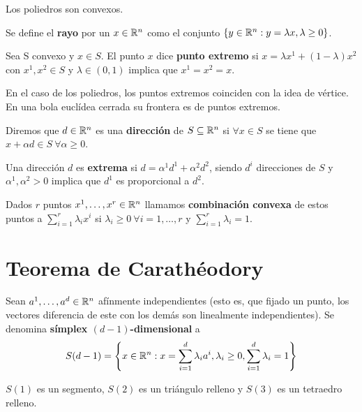 \documentclass[PM.tex]{subfiles}
\begin{document}
\begin{coro}
Los poliedros son convexos.
\end{coro}

\begin{defi}
Se define el \textbf{rayo} por un $x\in\mathbb{R}^n$ como el conjunto $\left\{y\in\mathbb{R}^n: y=\lambda x, \lambda\geq 0\right\}$.
\end{defi}

\begin{defi}
Sea S convexo y $x\in S$. El punto $x$ dice \textbf{punto extremo} si $x=\lambda x^1 +(1-\lambda)x^2$ con $x^1,x^2\in S$ y $\lambda\in (0,1)$ implica que $x^1=x^2=x$.
\end{defi}
\begin{nota}  En el caso de los poliedros, los puntos extremos coinciden con la idea de vértice. En una bola euclídea cerrada su frontera es de puntos extremos.
\end{nota}

\begin{defi}
Diremos que $d\in\mathbb{R}^n$ es una \textbf{dirección} de $S\subseteq\mathbb{R}^n$ si $\forall x\in S$ se tiene que $x+\alpha d\in S\ \forall\alpha\geq 0$.
\end{defi}

\begin{defi} Una dirección $d$ es \textbf{extrema} si $d=\alpha^1d^1+\alpha^2d^2$, siendo $d^i$ direcciones de $S$ y $\alpha^1,\alpha^2>0$ implica que $d^1$ es proporcional a $d^2$.
\end{defi}

\begin{defi}
Dados $r$ puntos $x^1,\dots, x^r\in\mathbb{R}^n$ llamamos \textbf{combinación convexa} de estos puntos a $\sum_{i=1}^r\lambda_i x^i$ si $\lambda_i\geq 0\ \forall i=1,\dots, r$ y $\sum_{i=1}^r\lambda_i=1$.
\end{defi}

\section{Teorema de Carathéodory}
\begin{defi} Sean $a^1,\dots, a^d\in\mathbb{R}^n$ afínmente independientes (esto es, que fijado un punto, los vectores diferencia de este con los demás son linealmente independientes). Se denomina \textbf{símplex $(d-1)$-dimensional} a 
\[
S(d-1)= \left\{x\in\mathbb{R}^n:x=\sum_{i=1}^d\lambda_i a^i,\lambda_i\geq 0, \sum_{i=1}^d\lambda_i =1\right\}
\]
\end{defi}
\begin{example}
$S(1)$ es un segmento, $S(2)$ es un triángulo relleno y $S(3)$ es un tetraedro relleno.
\end{example}
\end{document}
